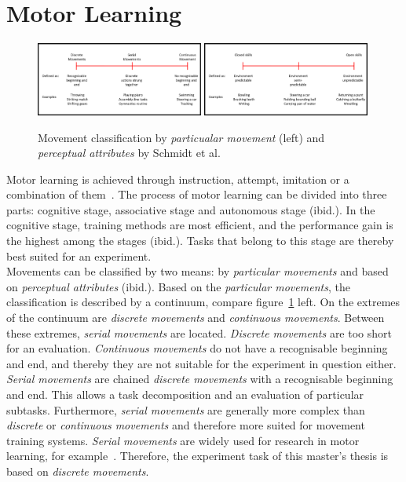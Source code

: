 \section{Motor Learning}
\label{section:motor_learning}
\begin{figure}[htb]
	\centering
	\includegraphics[width=0.49\textwidth]{figures/movement_classification.png}
	\includegraphics[width=0.49\textwidth]{figures/movement_classification2.png}
	\caption[Movement classifications by Scmhidt et al.]{Movement classification by \textit{particualar movement} (left) and \textit{perceptual attributes} by Schmidt et al.~\cite{mlbook}}
	\label{fig:movement_classification}
\end{figure}
Motor learning is achieved through instruction, attempt, imitation or a combination of them~\cite{mlbook}. The process of motor learning can be divided into three parts: cognitive stage, associative stage and autonomous stage (ibid.). In the cognitive stage, training methods are most efficient, and the performance gain is the highest among the stages (ibid.). Tasks that belong to this stage are thereby best suited for an experiment.\\
Movements can be classified by two means: by \textit{particular movements} and based on \textit{perceptual attributes} (ibid.). Based on the \textit{particular movements}, the classification is described by a continuum, compare figure~\ref{fig:movement_classification} left. On the extremes of the continuum are \textit{discrete movements} and \textit{continuous movements}. Between these extremes, \textit{serial movements} are located. \textit{Discrete movements} are too short for an evaluation. \textit{Continuous movements} do not have a recognisable beginning and end, and thereby they are not suitable for the experiment in question either. \textit{Serial movements} are chained \textit{discrete movements} with a recognisable beginning and end. This allows a task decomposition and an evaluation of particular subtasks. Furthermore, \textit{serial movements} are generally more complex than \textit{discrete} or \textit{continuous movements} and therefore more suited for movement training systems. \textit{Serial movements} are widely used for research in motor learning, for example~\cite{lightguide,mythaichicoaches,elearningma}. Therefore, the experiment task of this master's thesis is based on \textit{discrete movements}.\\
